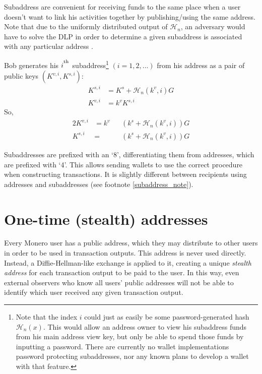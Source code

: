 Subaddress are convenient for receiving funds to the same place when a user doesn’t want to link his activities together by publishing/using the same address. Note that due to the uniformly distributed output of $\mathcal{H}_n$, an adversary would have to solve the DLP in order to determine a given subaddress is associated with any particular address \cite{MRL-0006}.

Bob generates his $i^\textsuperscript{th}$ subaddress\footnote{Note that the index $i$ could just as easily be some password-generated hash $\mathcal{H}_n(x)$. This would allow an address owner to view his subaddress funds from his main address view key, but only be able to spend those funds by inputting a password. There are currently no wallet implementations password protecting subaddresses, nor any known plans to develop a wallet with that feature.} $(i = 1, 2, ...)$ from his address as a pair of public keys $(K^{v,i}, K^{s,i})$:\\
\begin{align*}
    K^{s,i} &= K^s + \mathcal{H}_n(k^v, i) G\\
    K^{v,i} &= k^v K^{s,i}
\end{align*}
\quad So,
\begin{alignat*}{2}
    K^{v,i} &= k^v&&(k^s + \mathcal{H}_n(k^v, i))G\\
    K^{s,i} &= &&(k^s + \mathcal{H}_n(k^v, i))G
\end{alignat*}
    
Subaddresses are prefixed with an ‘8’, differentiating them from addresses, which are prefixed with ‘4’. This allows sending wallets to use the correct procedure when constructing transactions. It is slightly different between recipients using addresses and subaddresses (see footnote \ref{subaddress_note}).



\section{One-time (stealth) addresses}
\label{sec:one-time-addresses}

Every Monero user has a public address, which they may distribute to other users in order to be used in transaction outputs. This address is never used directly. Instead, a Diffie-Hellman-like exchange is applied to it, creating a unique {\em stealth address} for each transaction output to be paid to the user. In this way, even external observers who know all users’ public addresses will not be able to identify which user received any given transaction output.
\\

